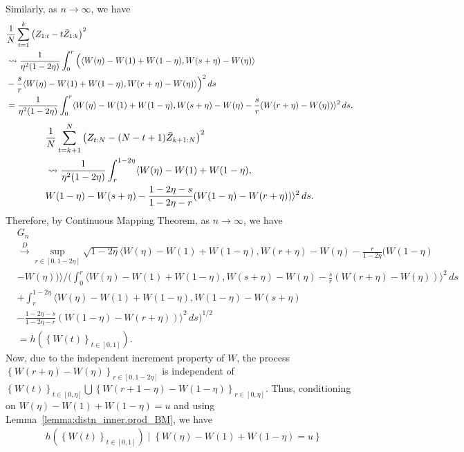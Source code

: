 \documentclass[11pt]{article}
\theoremstyle{plain}
\theoremstyle{definition}
\theoremstyle{remark}
\begin{document}
\begin{appendix}
\begin{align*}
\end{align*}
Similarly, as $n \to \infty$, we have
\begin{align*}
    &\frac{1}{N}\sum_{t=1}^k\left(Z_{1:t}-t\Bar{Z}_{1:k}\right)^2 \\
    &\leadsto \frac{1}{\eta^2(1-2\eta)}\int_{0}^{r} \Big(\langle W(\eta)-W(1)+W(1-\eta), W(s+\eta) -W(\eta)\rangle\\
    &-\frac{s}{r}\langle W(\eta)-W(1)+W(1-\eta), W(r+\eta) -W(\eta)\rangle\Big)^2\,ds\\
    &=\frac{1}{\eta^2(1-2\eta)}\int_{0}^{r} \langle W(\eta)-W(1)+W(1-\eta), W(s+\eta) -W(\eta)-\frac{s}{r}(W(r+\eta)-W(\eta))\rangle^2\,ds.
\end{align*}
\begin{align*}
    &\frac{1}{N}\sum_{t=k+1}^{N}\left(Z_{t:N}-(N-t+1)\Bar{Z}_{k+1:N}\right)^2\\
    &\leadsto \frac{1}{\eta^2(1-2\eta)}\int_{r}^{1-2\eta} \langle W(\eta)-W(1)+W(1-\eta),\\
    &W(1-\eta) -W(s+\eta)-\frac{1-2\eta-s}{1-2\eta-r}(W(1-\eta)-W(r+\eta))\rangle^2\,ds.
\end{align*}
Therefore, by Continuous Mapping Theorem, as $n \to \infty$, we have
\begin{align*}
    &G_n\\
    &\overset{D}{\to} \sup_{ r \in [0,1-2\eta]}\sqrt{1-2\eta}\langle W(\eta)-W(1)+W(1-\eta), W(r+\eta) -W(\eta) -\frac{r}{1-2\eta}(W(1-\eta)\\
    &-W(\eta))\rangle\Big/\Big(\int_{0}^{r} \langle W(\eta)-W(1)+W(1-\eta), W(s+\eta) -W(\eta)-\frac{s}{r}(W(r+\eta)-W(\eta))\rangle^2\,ds\\
    &+\int_{r}^{1-2\eta} \langle W(\eta)-W(1)+W(1-\eta), W(1-\eta) -W(s+\eta)\\
    &-\frac{1-2\eta-s}{1-2\eta-r}(W(1-\eta)-W(r+\eta))\rangle^2\,ds\Big)^{1/2}\\
    &=h\left(\left\{W(t)\right\}_{t \in [0,1]}\right).
\end{align*}
Now, due to the independent increment property of $W$, the process $\left\{W(r+\eta)-W(\eta)\right\}_{r \in [0,1-2\eta]}$ is independent of\newline \noindent $\left\{W(t)\right\}_{t \in [0,\eta]}\bigcup \left\{W(r+1-\eta)-W(1-\eta)\right\}_{r \in [0,\eta]}$. Thus, conditioning on $W(\eta)-W(1)+W(1-\eta)=u$ and using Lemma~\ref{lemma:distn_inner.prod_BM}, we have
\begin{align*}
    &h\left(\left\{W(t)\right\}_{t \in [0,1]}\right) \mid \left\{W(\eta)-W(1)+W(1-\eta)=u\right\}\\

\end{align*}
\end{appendix}
\end{document}
